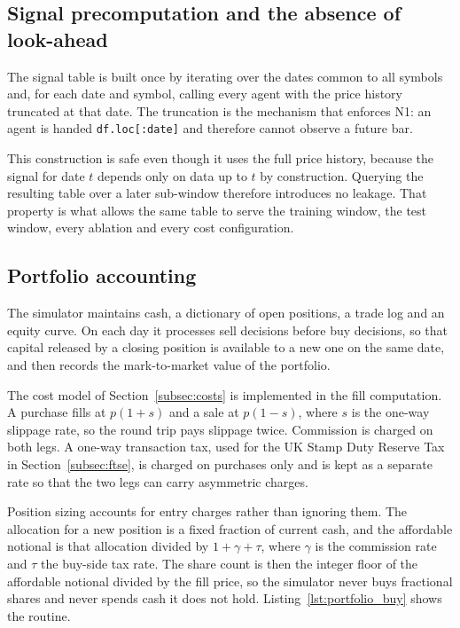 \subsection{Signal precomputation and the absence of look-ahead}\label{subsec:precompute}

The signal table is built once by iterating over the dates common to all symbols and, for each date and symbol, calling every agent with the price history truncated at that date. The truncation is the mechanism that enforces N1: an agent is handed \texttt{df.loc[:date]} and therefore cannot observe a future bar.

This construction is safe even though it uses the full price history, because the signal for date $t$ depends only on data up to $t$ by construction. Querying the resulting table over a later sub-window therefore introduces no leakage. That property is what allows the same table to serve the training window, the test window, every ablation and every cost configuration.

\subsection{Portfolio accounting}\label{subsec:portfolio_impl}

The simulator maintains cash, a dictionary of open positions, a trade log and an equity curve. On each day it processes sell decisions before buy decisions, so that capital released by a closing position is available to a new one on the same date, and then records the mark-to-market value of the portfolio.

The cost model of Section~\ref{subsec:costs} is implemented in the fill computation. A purchase fills at $p(1 + s)$ and a sale at $p(1 - s)$, where $s$ is the one-way slippage rate, so the round trip pays slippage twice. Commission is charged on both legs. A one-way transaction tax, used for the UK Stamp Duty Reserve Tax in Section~\ref{subsec:ftse}, is charged on purchases only and is kept as a separate rate so that the two legs can carry asymmetric charges.

Position sizing accounts for entry charges rather than ignoring them. The allocation for a new position is a fixed fraction of current cash, and the affordable notional is that allocation divided by $1 + \gamma + \tau$, where $\gamma$ is the commission rate and $\tau$ the buy-side tax rate. The share count is then the integer floor of the affordable notional divided by the fill price, so the simulator never buys fractional shares and never spends cash it does not hold. Listing~\ref{lst:portfolio_buy} shows the routine.


